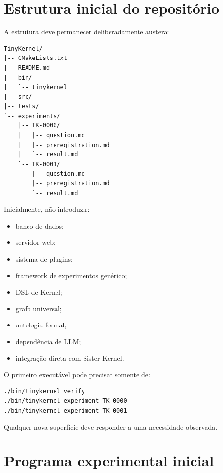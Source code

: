 \documentclass[11pt,a4paper]{article}
\begin{document}
\section{Estrutura inicial do repositório}

A estrutura deve permanecer deliberadamente austera:

\begin{lstlisting}
TinyKernel/
|-- CMakeLists.txt
|-- README.md
|-- bin/
|   `-- tinykernel
|-- src/
|-- tests/
`-- experiments/
    |-- TK-0000/
    |   |-- question.md
    |   |-- preregistration.md
    |   `-- result.md
    `-- TK-0001/
        |-- question.md
        |-- preregistration.md
        `-- result.md
\end{lstlisting}

Inicialmente, não introduzir:

\begin{itemize}
  \item banco de dados;
  \item servidor web;
  \item sistema de plugins;
  \item framework de experimentos genérico;
  \item DSL de Kernel;
  \item grafo universal;
  \item ontologia formal;
  \item dependência de LLM;
  \item integração direta com Sister-Kernel.
\end{itemize}

O primeiro executável pode precisar somente de:

\begin{lstlisting}
./bin/tinykernel verify
./bin/tinykernel experiment TK-0000
./bin/tinykernel experiment TK-0001
\end{lstlisting}

Qualquer nova superfície deve responder a uma necessidade observada.

\section{Programa experimental inicial}
\end{document}
